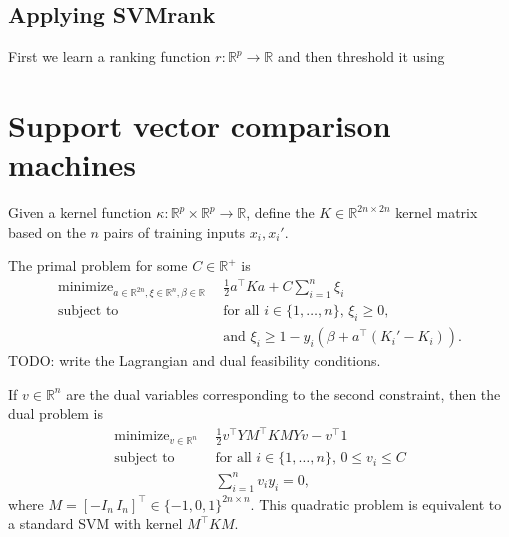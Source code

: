 \documentclass{article}
\newcommand{\RR}{\mathbb R}
\DeclareMathOperator*{\minimize}{minimize}
\begin{document}
\subsection{Applying SVMrank}

First we learn a ranking function $r:\RR^p \rightarrow \RR$ and then
threshold it using 

\section{Support vector comparison machines}
\label{sec:svm-compare}

Given a kernel function $\kappa:\RR^p\times \RR^p\rightarrow\RR$,
define the $K\in\RR^{2n\times 2n}$ kernel matrix based on the $n$
pairs of training inputs $x_i,x_i'$.


The primal problem for some $C\in\RR^+$ is
\begin{equation}
  \begin{aligned}
      \minimize_{a\in\RR^{2n},\xi\in\RR^n,\beta\in\RR}\ \ & 
      \frac 1 2 a^\intercal K a + C\sum_{i=1}^n \xi_i \\
      \text{subject to}\ \ & 
      \text{for all $i\in\{1,\dots,n\}$, }
      \xi_i \geq 0,\\
      &\text{and }
      \xi_i \geq 1-y_i(\beta + a^\intercal (K_i'-K_i)).
  \end{aligned}
\end{equation}
TODO: write the Lagrangian and dual feasibility conditions.

If $v\in\RR^n$ are the dual variables corresponding to the second
constraint, then the dual problem is
\begin{equation}
  \begin{aligned}
    \minimize_{v\in\RR^n}\ \ &
    \frac 1 2 v^\intercal Y M^\intercal K M Y v - v^\intercal 1\\
    \text{subject to}\ \ &
    \text{for all $i\in\{1,\dots,n\}$, } 0\leq v_i\leq C\\
    & \sum_{i=1}^n v_i y_i = 0,
  \end{aligned}
\end{equation}
where $M=[-I_n \, I_n]^\intercal\in\{-1,0,1\}^{2n\times n}$. This quadratic problem
is equivalent to a standard SVM with kernel $M^\intercal K M$.
\end{document}
